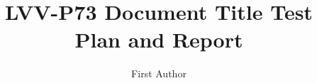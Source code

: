 \documentclass[DM,lsstdraft,toc]{lsstdoc}
\begin{document}
\def\milestoneName{Document Title}
\def\milestoneId{LVV-P73}
\def\product{Data Management}


\title{LVV-P73 Document Title Test Plan and Report}
\setDocRef{\lsstDocType-\lsstDocNum}
\date{\vcsdate}
\author{First Author}



\end{document}
